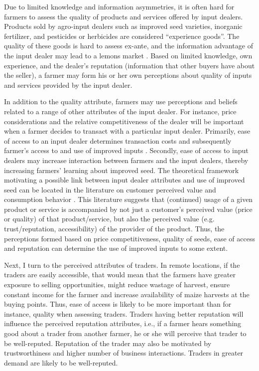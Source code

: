 \documentclass[12pt,english]{article}\usepackage[]{graphicx}\usepackage[]{color}
\begin{document}
\begin{onehalfspace}
Due to limited knowledge and information asymmetries, it is often
hard for farmers to assess the quality of products and services offered
by input dealers. Products sold by agro-input dealers such as improved
seed varieties, inorganic fertilizer, and pesticides or herbicides
are considered ``experience goods''. The quality of these goods
is hard to assess ex-ante, and the information advantage of the input
dealer may lead to a lemons market \citep{Bold2017}. Based on limited
knowledge, own experience, and the dealer's reputation (information
that other buyers have about the seller), a farmer may form his or
her own perceptions about quality of inputs and services provided
by the input dealer.

In addition to the quality attribute, farmers may use perceptions
and beliefs related to a range of other attributes of the input dealer.
For instance, price considerations and the relative competitiveness
of the dealer will be important when a farmer decides to transact
with a particular input dealer. Primarily, ease of access to an input
dealer determines transaction costs and subsequently farmer's access
to and use of improved inputs \citep{Alene2008}. Secondly, ease of
access to input dealers may increase interaction between farmers and
the input dealers, thereby increasing farmers' learning about improved
seed. The theoretical framework motivating a possible link between
input dealer attributes and use of improved seed can be located in
the literature on customer perceived value and consumption behavior
\citep{Jayashankar2018,Chiu2014}. This literature suggests that (continued)
usage of a given product or service is accompanied by not just a customer\textquoteright s
perceived value (price or quality) of that product/service, but also
the perceived value (e.g. trust/reputation, accessibility) of the
provider of the product. Thus, the perceptions formed based on price
competitiveness, quality of seeds, ease of access and reputation can
determine the use of improved inputs to some extent.

Next, I turn to the perceived attributes of traders. In remote locations,
if the traders are easily accessible, that would mean that the farmers
have greater exposure to selling opportunities, might reduce wastage
of harvest, ensure constant income for the farmer and increase availability
of maize harvests at the buying points. Thus, ease of access is likely
to be more important than for instance, quality when assessing traders.
Traders having better reputation will influence the perceived reputation
attributes, i.e., if a farmer hears something good about a trader
from another farmer, he or she will perceive that trader to be well-reputed.
Reputation of the trader may also be motivated by trustworthiness
and higher number of business interactions. Traders in greater demand
are likely to be well-reputed.


\end{onehalfspace}
\end{document}
